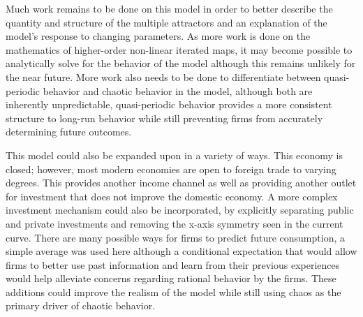Much work remains to be done on this model in order to better describe the quantity and structure of the multiple attractors and an explanation of the model's response to changing parameters. As more work is done on the mathematics of higher-order non-linear iterated maps, it may become possible to analytically solve for the behavior of the model although this remains unlikely for the near future. More work also needs to be done to differentiate between quasi-periodic behavior and chaotic behavior in the model, although both are inherently unpredictable, quasi-periodic behavior provides a more consistent structure to long-run behavior while still preventing firms from accurately determining future outcomes.

This model could also be expanded upon in a variety of ways. This economy is closed; however, most modern economies are open to foreign trade to varying degrees. This provides another income channel as well as providing another outlet for investment that does not improve the domestic economy. A more complex investment mechanism could also be incorporated, by explicitly separating public and private investments and removing the x-axis symmetry seen in the current curve. There are many possible ways for firms to predict future consumption, a simple average was used here although a conditional expectation that would allow firms to better use past information and learn from their previous experiences would help alleviate concerns regarding rational behavior by the firms. These additions could improve the realism of the model while still using chaos as the primary driver of chaotic behavior. 



